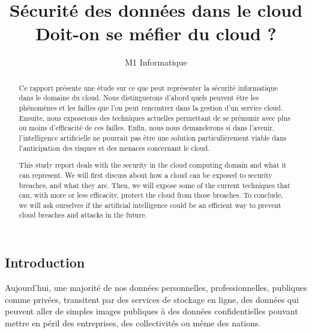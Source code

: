 \documentclass[a4paper, 12pt]{article}
\title{Sécurité des données dans le cloud\\Doit-on se méfier du cloud ?}
\author{M1 Informatique}
\date{}
\begin{document}
  \begin{spacing}{1.1}
  \renewcommand{\thepage}{}
  \maketitle
  \newpage
  \tableofcontents
  \newpage

  \renewcommand{\thepage}{\arabic{page}}
  \setcounter{page}{1}
  \begin{abstract}
    Ce rapport présente une étude sur ce que peut représenter la sécurité
    informatique dans le domaine du cloud. Nous distinguerons d'abord quels
    peuvent être les phénomènes et les failles que l'on peut rencontrer dans la
    gestion d'un service cloud. Ensuite, nous exposerons des techniques
    actuelles permettant de se prémunir avec plus ou moins d'efficacité de ces
    failles. Enfin, nous nous demanderons si dans l'avenir, l'intelligence
    artificielle ne pourrait pas être une solution particulièrement viable dans
    l'anticipation des risques et des menaces concernant le cloud.
  \end{abstract}

  \begin{abstract}
    This study report deals with the security in the cloud computing domain and
    what it can represent. We will first discuss about how a cloud can be
    exposed to security breaches, and what they are. Then, we will expose some
    of the current techniques that can, with more or less efficacity, protect
    the cloud from those breaches. To conclude, we will ask ourselves if the
    artificial intelligence could be an efficient way to prevent cloud breaches
    and attacks in the future.
  \end{abstract}

  \newpage
  \section{Introduction}
    Aujourd'hui, une majorité de nos données personnelles, professionnelles,
    publiques comme privées, transitent par des services de stockage en ligne,
    des données qui peuvent aller de simples images publiques à des données
    confidentielles pouvant mettre en péril des entreprises, des collectivités
    ou même des nations. \\


\end{spacing}
\end{document}
